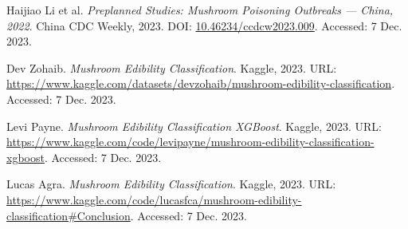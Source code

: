 \documentclass{article}
\begin{document}
\begin{thebibliography}{9}

Haijiao Li et al.
\textit{Preplanned Studies: Mushroom Poisoning Outbreaks — China, 2022}.
China CDC Weekly, 2023.
DOI: \url{10.46234/ccdcw2023.009}.
Accessed: 7 Dec. 2023.

Dev Zohaib.
\textit{Mushroom Edibility Classification}.
Kaggle, 2023.
URL: \url{https://www.kaggle.com/datasets/devzohaib/mushroom-edibility-classification}.
Accessed: 7 Dec. 2023.

Levi Payne.
\textit{Mushroom Edibility Classification XGBoost}.
Kaggle, 2023.
URL: \url{https://www.kaggle.com/code/levipayne/mushroom-edibility-classification-xgboost}.
Accessed: 7 Dec. 2023.

Lucas Agra.
\textit{Mushroom Edibility Classification}.
Kaggle, 2023.
URL: \url{https://www.kaggle.com/code/lucasfca/mushroom-edibility-classification#Conclusion}.
Accessed: 7 Dec. 2023.

\end{thebibliography}
\end{document}
